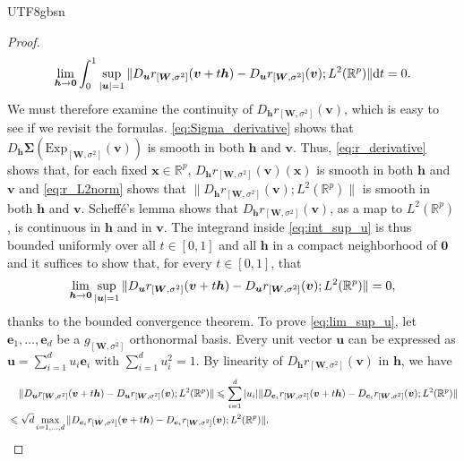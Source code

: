 \documentclass[12pt]{report}
\newcommand\tab[1][1cm]{\hspace*{#1}}
\theoremstyle{plain}
\theoremstyle{definition}
\begin{document}
\begin{CJK*}{UTF8}{gbsn}
\begin{proof}
\begin{equation}\label{eq:int_sup_u}
  \lim_{\bm{h} \to \bm{0}} 
  \int_{0}^1 \sup_{\abs{\bm{u}} = 1}
  \|D_{\bm{u}}r_{[\bm{W},\sigma^2]}(\bm{v}+t\bm{h})- D_{\bm{u}}r_{[\bm{W},\sigma^2]}(\bm{v})
  ;L^2(\mathbb{R}^p)	\| \mathrm{d} t = 0.
\end{equation}
We must therefore examine the continuity of $D_{\bm{h}}r_{[\bm{W},\sigma^2]}(\bm{v})$,
which is easy to see if we revisit the formulas.
\eqref{eq:Sigma_derivative} shows that $ D_{\bm{h}}\bm{\Sigma}(\text{Exp}_{[\bm{W},\sigma^2]}(\bm{v}))$
is smooth in both $\bm{h}$ and $\bm{v}$.
Thus,
\eqref{eq:r_derivative} shows that,
for each fixed $\bm{x} \in \mathbb{R}^p$,
$D_{\bm{h}}r_{[\bm{W},\sigma^2]}(\bm{v})(\bm{x})$ 
is smooth in both $\bm{h}$ and $\bm{v}$
and \eqref{eq:r_L2norm}
shows that $\|D_{\bm{h}}r_{[\bm{W},\sigma^2]}(\bm{v});L^2(\mathbb{R}^p)	\|$
is smooth in both $\bm{h}$ and $\bm{v}$.
Scheffé's lemma shows that
$D_{\bm{h}}r_{[\bm{W},\sigma^2]}(\bm{v})$, as a map to $L^2(\mathbb{R}^p)$,
is continuous in $\bm{h}$ and in $\bm{v}$.
The integrand inside \eqref{eq:int_sup_u}
is thus bounded uniformly 
over all $t \in [0,1]$ and all $\bm{h}$
in a compact neighborhood of $\bm{0}$
and it suffices to show 
that, for every $t \in [0,1]$, that 
\begin{equation}\label{eq:lim_sup_u}
  \lim_{\bm{h} \to \bm{0}} 
  \sup_{\abs{\bm{u}} = 1}
  \|D_{\bm{u}}r_{[\bm{W},\sigma^2]}(\bm{v}+t\bm{h})- D_{\bm{u}}r_{[\bm{W},\sigma^2]}(\bm{v})
  ;L^2(\mathbb{R}^p)	\|  = 0,
\end{equation}
thanks to the bounded convergence theorem.
To prove \eqref{eq:lim_sup_u}, 
let $\bm{e}_1, \ldots, \bm{e}_d$ 
be a $g_{[\bm{W},\sigma^2]}$ orthonormal basis.
Every unit vector $\bm{u}$ can be 
expressed as $\bm{u} = \sum_{i=1}^d u_i \bm{e}_i$
with $\sum_{i=1}^d u_i^2 = 1$.
By linearity of $D_{\bm{h}}r_{[\bm{W},\sigma^2]}(\bm{v})$ in $\bm{h}$, 
we have 
\begin{equation*}
  \begin{split}
  & \tab[0.4cm] \|D_{\bm{u}}r_{[\bm{W},\sigma^2]}(\bm{v}+t\bm{h}) - D_{\bm{u}}r_{[\bm{W},\sigma^2]}(\bm{v});L^2(\mathbb{R}^p)	\| 
  \leqslant \sum_{i=1}^d \abs{u_i}\|D_{\bm{e}_i}r_{[\bm{W},\sigma^2]}(\bm{v}+t\bm{h}) - 
  D_{\bm{e}_i}r_{[\bm{W},\sigma^2]}(\bm{v});L^2(\mathbb{R}^p)	\|
  \\ & \leqslant \sqrt{d} \max_{i=1, \ldots, d} \|D_{\bm{e}_i}r_{[\bm{W},\sigma^2]}(\bm{v}+t\bm{h}) - 
  D_{\bm{e}_i}r_{[\bm{W},\sigma^2]}(\bm{v});L^2(\mathbb{R}^p)	\|.
  \end{split}

\end{equation*}
\end{proof}
\end{CJK*}
\end{document}
